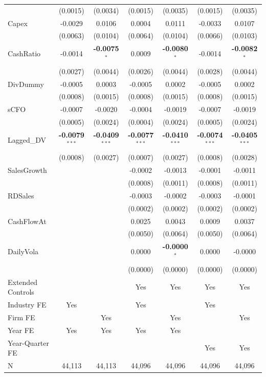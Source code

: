 \documentclass[11pt,a4paper]{article}
\begin{document}
\begin{table}[htbp]
\begin{tabular}{lcccccc}
 & (0.0015) & (0.0034) & (0.0015) & (0.0035) & (0.0015) & (0.0035) \\
Capex & -0.0029 & 0.0106 & 0.0004 & 0.0111 & -0.0033 & 0.0107 \\
 & (0.0063) & (0.0104) & (0.0064) & (0.0104) & (0.0066) & (0.0103) \\
CashRatio & -0.0014 & \textbf{-0.0075}$^{*}$ & 0.0009 & \textbf{-0.0080}$^{*}$ & -0.0014 & \textbf{-0.0082}$^{*}$ \\
 & (0.0027) & (0.0044) & (0.0026) & (0.0044) & (0.0028) & (0.0044) \\
DivDummy & -0.0005 & 0.0003 & -0.0005 & 0.0002 & -0.0005 & 0.0002 \\
 & (0.0008) & (0.0015) & (0.0008) & (0.0015) & (0.0008) & (0.0015) \\
sCFO & -0.0007 & -0.0020 & -0.0004 & -0.0019 & -0.0007 & -0.0019 \\
 & (0.0005) & (0.0024) & (0.0004) & (0.0024) & (0.0005) & (0.0024) \\
Lagged\_DV & \textbf{-0.0079}$^{***}$ & \textbf{-0.0409}$^{***}$ & \textbf{-0.0077}$^{***}$ & \textbf{-0.0410}$^{***}$ & \textbf{-0.0074}$^{***}$ & \textbf{-0.0405}$^{***}$ \\
 & (0.0008) & (0.0027) & (0.0007) & (0.0027) & (0.0008) & (0.0028) \\
SalesGrowth &  &  & -0.0002 & -0.0013 & -0.0001 & -0.0011 \\
 &  &  & (0.0008) & (0.0011) & (0.0008) & (0.0011) \\
RDSales &  &  & -0.0003 & -0.0002 & -0.0003 & -0.0001 \\
 &  &  & (0.0002) & (0.0002) & (0.0002) & (0.0002) \\
CashFlowAt &  &  & 0.0025 & 0.0043 & 0.0009 & 0.0037 \\
 &  &  & (0.0050) & (0.0064) & (0.0050) & (0.0064) \\
DailyVola &  &  & 0.0000 & \textbf{-0.0000}$^{*}$ & 0.0000 & -0.0000 \\
 &  &  & (0.0000) & (0.0000) & (0.0000) & (0.0000) \\
\midrule
Extended Controls &  &  & Yes & Yes & Yes & Yes \\
Industry FE & Yes &  & Yes &  & Yes &  \\
Firm FE &  & Yes &  & Yes &  & Yes \\
Year FE & Yes & Yes & Yes & Yes &  &  \\
Year-Quarter FE &  &  &  &  & Yes & Yes \\
\midrule
N & 44,113 & 44,113 & 44,096 & 44,096 & 44,096 & 44,096 \\

\end{tabular}
\end{table}
\end{document}
